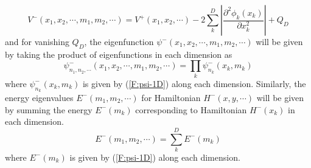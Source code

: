 \documentclass[12pt]{article}
\numberwithin{equation}{section} %
\begin{document}
\begin{equation}\label{F:V-}
    V^-(x_1,x_2,\cdots,m_1,m_2,\cdots) = V^+(x_1,x_2,\cdots) - 2\sum_{k}^{D}\left|\frac{\partial^2 \phi_k(x_k)}{\partial x_k^2}\right|+Q_D
\end{equation}
and for vanishing \(Q_D\), the eigenfunction $\psi^-(x_1,x_2,\cdots,m_1,m_2,\cdots)$ will be given by taking the product of eigenfunctions in each dimension as
\begin{equation}\label{F:psi-}
    \psi^-_{n_1,n_2,\cdots}(x_1,x_2,\cdots,m_1,m_2,\cdots) = \prod_{k}\psi^-_{n_k}(x_k,m_k)
\end{equation}
where $\psi^-_{n_k}(x_k,m_k)$ is given by (\ref{F:psi-1D}) along each dimension. Similarly, the energy eigenvalues $E^-(m_1,m_2,\cdots)$ for Hamiltonian $H^-(x,y,\cdots)$ will be given by summing the energy $E^-(m_k)$ corresponding to Hamiltonian $H^-(x_k)$ in each dimension.
\begin{equation}\label{F:E-}
    E^-(m_1,m_2,\cdots) = \sum_{k}^{D}E^-(m_k)
\end{equation}
where \(E^-(m_k)\) is given by (\ref{F:psi-1D}) along each dimension.


\renewcommand{\theequation}{C.\arabic{equation}} %
\setcounter{equation}{0} %
\end{document}
